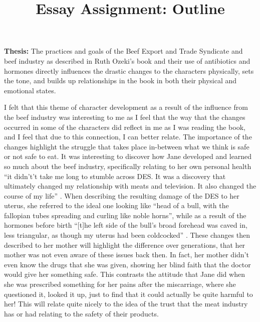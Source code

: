 \documentclass{article}
\title{Essay Assignment: Outline}
\begin{document}
\makeheader
\textbf{Thesis:} The practices and goals of the Beef Export and Trade
Syndicate and beef industry as described in Ruth Ozeki's book
 and their use of antibiotics and hormones directly
influences the drastic changes to the characters physically, sets the tone,
and builds up relationships in the book in both their physical and emotional
states.


I felt that this theme of character development as a result of the influence
from the beef industry was interesting to me as I feel that the way that the
changes occurred in some of the characters did reflect in me as I was
reading the book, and I feel that due to this connection, I can better
relate. The importance of the changes highlight the struggle that takes
place in-between what we think is safe or not safe to eat. It was
interesting to discover how Jane developed and learned so much about the
beef industry, specifically relating to her own personal health ``it
didn't’t take me long to stumble across DES. It was a discovery that
ultimately changed my relationship with meats and television. It also
changed the course of my life'' \cite{ozeki1998my}. When describing the
resulting damage of the DES to her uterus, she referred to the ideal one
looking like ``head of a bull, with the fallopian tubes spreading and
curling like noble horns'', while as a result of the hormones before birth
``[t]he left side of the bull’s broad forehead was caved in, less
triangular, as though my uterus had been coldcocked'' \cite{ozeki1998my}.
These changes then described to her mother will highlight the difference
over generations, that her mother was not even aware of these issues back
then. In fact, her mother didn't even know the drugs that she was given,
showing her blind faith that the doctor would give her something safe. This
contrasts the attitude that Jane did when she was prescribed something for
her pains after the miscarriage, where she questioned it, looked it up, just
to find that it could actually be quite harmful to her! This will relate
quite nicely to the idea of the trust that the meat industry has or had
relating to the safety of their products.
\end{document}
